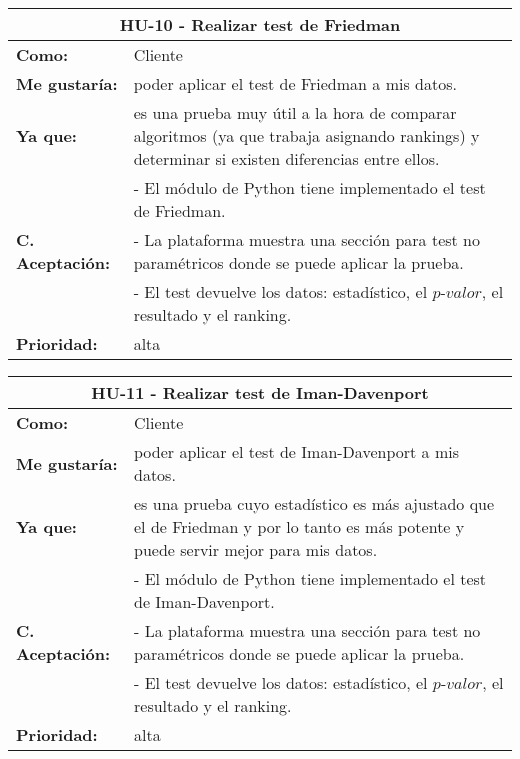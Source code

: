 
\begin{table}[H]
	\begin{tabular}{| p{3cm}| p{11cm} |}
		\hline
		\multicolumn{2}{|c|}{\textbf{HU-10} - Realizar test de Friedman} \\ \hline
		\textbf{Como:} & Cliente \\ \hline
		\textbf{Me gustaría:} & poder aplicar el test de Friedman a mis datos. \\ \hline
		\textbf{Ya que:} & es una prueba muy útil a la hora de comparar algoritmos (ya que trabaja asignando rankings) y determinar si existen diferencias entre ellos. \\ \hline
		\multirow{3}{11cm}{\textbf{C. Aceptación:}} & - El módulo de Python tiene implementado el test de Friedman. \\
		& - La plataforma muestra una sección para test no paramétricos donde se puede aplicar la prueba. \\
		& - El test devuelve los datos: estadístico, el $\textit{p-valor}$, el resultado y el ranking. \\ \hline
		\textbf{\textbf{Prioridad:}} & alta \\ \hline
	\end{tabular}
\end{table}


\begin{table}[H]
	\begin{tabular}{| p{3cm}| p{11cm} |}
		\hline
		\multicolumn{2}{|c|}{\textbf{HU-11} - Realizar test de Iman-Davenport} \\ \hline
		\textbf{Como:} & Cliente \\ \hline
		\textbf{Me gustaría:} & poder aplicar el test de Iman-Davenport a mis datos. \\ \hline
		\textbf{Ya que:} & es una prueba cuyo estadístico es más ajustado que el de Friedman y por lo tanto es más potente y puede servir mejor para mis datos. \\ \hline
		\multirow{3}{11cm}{\textbf{C. Aceptación:}} & - El módulo de Python tiene implementado el test de Iman-Davenport. \\
		& - La plataforma muestra una sección para test no paramétricos donde se puede aplicar la prueba. \\
		& - El test devuelve los datos: estadístico, el $\textit{p-valor}$, el resultado y el ranking. \\ \hline
		\textbf{\textbf{Prioridad:}} & alta \\ \hline
	\end{tabular}
\end{table}

